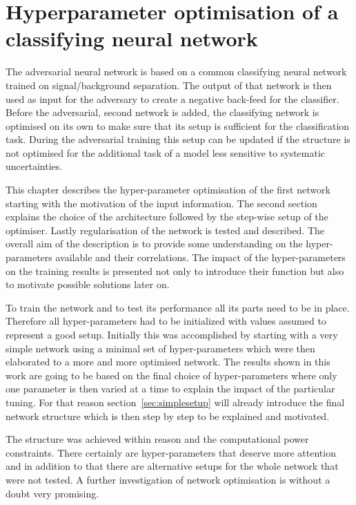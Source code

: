 \chapter{Hyperparameter optimisation of a classifying neural network}
\label{chp:simpleNN}

The adversarial neural network is based on a common classifying neural network trained on signal/background separation. The output of that network is then used as input for the adversary to create a negative back-feed for the classifier.
Before the adversarial, second network is added, the classifying network is optimised on its own to make sure that its setup is sufficient for the classification task.
During the adversarial training this setup can be updated if the structure is not optimised for the additional task of a model less sensitive to systematic uncertainties.

This chapter describes the hyper-parameter optimisation of the first network starting with the motivation of the input information.
The second section explains the choice of the architecture followed by the step-wise setup of the optimiser.
Lastly regularisation of the network is tested and described.
The overall aim of the description is to provide some understanding on the hyper-parameters available and their correlations. The impact of the hyper-parameters on the training results is presented not only to introduce their function but also to motivate possible solutions later on.

To train the network and to test its performance all its parts need to be in place. Therefore all hyper-parameters had to be initialized with values assumed to represent a good setup. Initially this was accomplished by starting with a very simple network using a minimal set of hyper-parameters which were then elaborated to a more and more optimised network. The results shown in this work are going to be based on the final choice of hyper-parameters where only one parameter is then varied at a time to explain the impact of the particular tuning. For that reason section~\ref{sec:simplesetup} will already introduce the final network structure which is then step by step to be explained and motivated.

The structure was achieved within reason and the computational power constraints. There certainly are hyper-parameters that deserve more attention and in addition to that there are alternative setups for the whole network that were not tested. A further investigation of network optimisation is without a doubt very promising.


